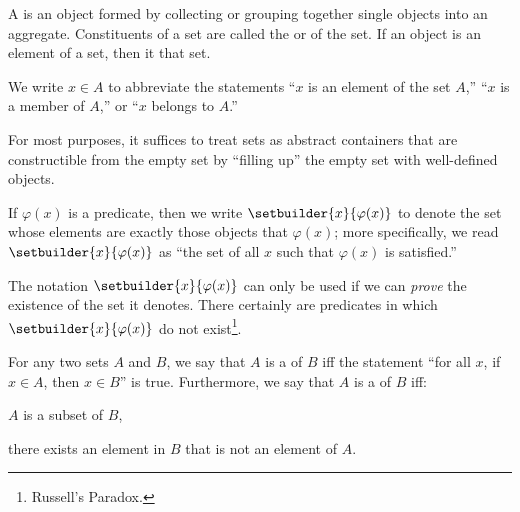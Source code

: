 \begin{dfn}[Sets]
     \label{dfn:metatheory-sets}
    A  is an object formed by collecting or grouping together single objects into an aggregate.
    Constituents of a set are called the  or  of the set.
    If an object is an element of a set, then it  that set.
\end{dfn}

\begin{notation}
    We write \( x \in A \) to abbreviate the statements ``\( x \) is an element of the set \( A \),''
    ``\( x \) is a member of \( A \),'' or ``\( x \) belongs to \( A \).''
\end{notation}

\begin{rem}
    For most purposes, it suffices to treat sets as abstract containers that are constructible
    from the empty set by ``filling up'' the empty set with well-defined objects.
\end{rem}

\begin{dfn}
     \label{dfn:metatheory-setbuilder-notation}
    If \( \varphi(x) \) is a predicate, then we write \( \setbuilder{x}{\varphi(x)} \) to denote the set
    whose elements are exactly those objects that  \( \varphi(x) \);
    more specifically, we read \( \setbuilder{x}{\varphi(x)} \) as ``the set of all \( x \) such that \( \varphi(x) \) is satisfied.''
\end{dfn}

\begin{rem}
    The notation \( \setbuilder{x}{\varphi(x)} \) can only be used if we can \emph{prove} the existence of the set it denotes.
    There certainly are predicates in which \( \setbuilder{x}{\varphi(x)} \) do not exist\footnote{Russell's Paradox.}.
\end{rem}

\begin{dfn}[Subsets]
     \label{dfn:metatheory-subsets-and-proper-subsets}
    For any two sets \( A \) and \( B \), we say that \( A \) is a  of \( B \) iff
    the statement ``for all \( x \), if \( x \in A \), then \( x \in B \)'' is true.
    Furthermore, we say that \( A \) is a  of \( B \) iff:
    \begin{enumerate*}[label=(\arabic*)]
        \item \( A \) is a subset of \( B \),
        \item there exists an element in \( B \) that is not an element of \( A \).
    \end{enumerate*}
\end{dfn}

